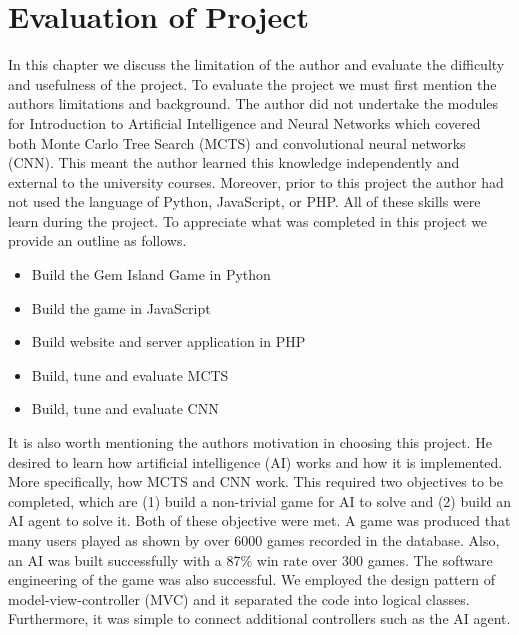 \documentclass{bhamthesis}
\theoremstyle{definition}
\begin{document}
\chapter{Evaluation of Project}
In this chapter we discuss the limitation of the author and evaluate the difficulty and usefulness of the project.
To evaluate the project we must first mention the authors limitations and background. The author did not undertake the modules for Introduction to Artificial Intelligence and Neural Networks which covered both Monte Carlo Tree Search (MCTS) and convolutional neural networks (CNN). This meant the author learned this knowledge independently and external to the university courses. Moreover, prior to this project the author had not used the language of Python, JavaScript, or PHP. All of these skills were learn during the project.
To appreciate what was completed in this project we provide an outline as follows.
\begin{itemize}
	\item Build the Gem Island Game in Python
	\item Build the game in JavaScript
	\item Build website and server application in PHP
	\item Build, tune and evaluate MCTS
	\item Build, tune and evaluate CNN
\end{itemize}

It is also worth mentioning the authors motivation in choosing this project. He desired to learn how artificial intelligence (AI) works and how it is implemented. More specifically, how MCTS and CNN work. This required two objectives to be completed, which are (1) build a non-trivial game for AI to solve and (2) build an AI agent to solve it. Both of these objective were met. A game was produced that many users played as shown by over 6000 games recorded in the database. Also, an AI was built successfully with a 87\% win rate over 300 games. 
The software engineering of the game was also successful. We employed the design pattern of model-view-controller (MVC) and it separated the code into logical classes. Furthermore, it was simple to connect additional controllers such as the AI agent.
\end{document}
